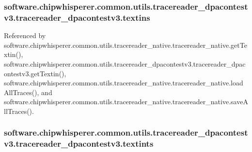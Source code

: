 \subsubsection[{textins}]{\setlength{\rightskip}{0pt plus 5cm}software.\+chipwhisperer.\+common.\+utils.\+tracereader\+\_\+dpacontestv3.\+tracereader\+\_\+dpacontestv3.\+textins}\label{classsoftware_1_1chipwhisperer_1_1common_1_1utils_1_1tracereader__dpacontestv3_1_1tracereader__dpacontestv3_a4aa518e20136f4480ad3fec31fcc7cbe}


Referenced by software.\+chipwhisperer.\+common.\+utils.\+tracereader\+\_\+native.\+tracereader\+\_\+native.\+get\+Textin(), software.\+chipwhisperer.\+common.\+utils.\+tracereader\+\_\+dpacontestv3.\+tracereader\+\_\+dpacontestv3.\+get\+Textin(), software.\+chipwhisperer.\+common.\+utils.\+tracereader\+\_\+native.\+tracereader\+\_\+native.\+load\+All\+Traces(), and software.\+chipwhisperer.\+common.\+utils.\+tracereader\+\_\+native.\+tracereader\+\_\+native.\+save\+All\+Traces().

\hypertarget{classsoftware_1_1chipwhisperer_1_1common_1_1utils_1_1tracereader__dpacontestv3_1_1tracereader__dpacontestv3_ab3dc54e9b76617ddea037a37f61abc6a}{}
\subsubsection[{textints}]{\setlength{\rightskip}{0pt plus 5cm}software.\+chipwhisperer.\+common.\+utils.\+tracereader\+\_\+dpacontestv3.\+tracereader\+\_\+dpacontestv3.\+textints}\label{classsoftware_1_1chipwhisperer_1_1common_1_1utils_1_1tracereader__dpacontestv3_1_1tracereader__dpacontestv3_ab3dc54e9b76617ddea037a37f61abc6a}
\hypertarget{classsoftware_1_1chipwhisperer_1_1common_1_1utils_1_1tracereader__dpacontestv3_1_1tracereader__dpacontestv3_a5e506bd057a1a0e4803144f6e6495c21}{}
